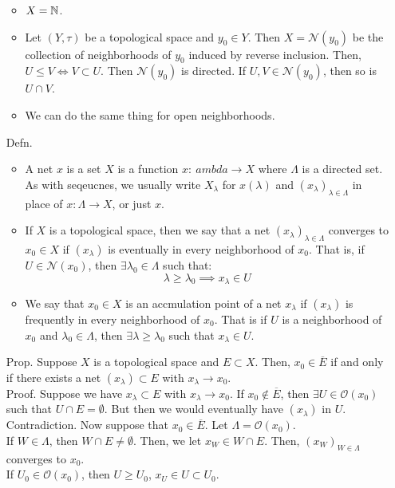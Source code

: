 \documentclass[12pt]{article}
\begin{document}
\begin{itemize}
\begin{itemize}
        \item $X = \N$. 
        \item Let $(Y, \tau)$ be a topological space and $y_0 \in Y$. Then $X = \mathcal{N}(y_0)$ be the collection of neighborhoods of $y_0$ induced by reverse inclusion. Then, $U \leq V \iff V \subset U$. Then $\mathcal{N}(y_0)$ is directed. If $U, V \in \mathcal{N}(y_0)$, then so is $U \cap V$. 
        \item We can do the same thing for open neighborhoods. 
    \end{itemize} 
    \item[Defn.] \begin{itemize}
        \item A net $x$ is a set $X$ is a function $x: \:ambda \to X$ where $\Lambda$ is a directed set. As with seqeucnes, we usually write $X_\lambda$ for $x(\lambda)$ and $(x_\lambda)_{\lambda \in \Lambda}$ in place of $x: \Lambda \to X$, or just $x$. 
        \item If $X$ is a topological space, then we say that a net $(x_\lambda)_{\lambda \in \Lambda}$ converges to $x_0 \in X$ if $(x_\lambda)$ is eventually in every neighborhood of $x_0$. That is, if $U \in \mathcal{N}(x_0)$, then $\exists \lambda_0 \in \Lambda$ such that: 
        \[ \lambda \geq \lambda_0  \implies x_\lambda \in U \]
        \item We say that $x_0 \in X$ is an accmulation point of a net $x_\lambda$ if $(x_\lambda)$ is frequently in every neighborhood of $x_0$. That is if $U$ is a neighborhood of $x_0$ and $\lambda_0 \in \Lambda$, then $\exists \lambda \geq \lambda_0$ such that $x_\lambda \in U$.
    \end{itemize}
    \item[Prop.] Suppose $X$ is a topological space and $E \subset X$. Then, $x_0 \in \overline{E}$ if and only if there exists a net $(x_\lambda) \subset E$ with $x_\lambda \to x_0$. \\
    Proof. Suppose we have $x_\lambda \subset E$ with $x_\lambda \to x_0$. If $x_0 \not \in \overline{E}$, then $\exists U \in \mathcal{O}(x_0)$ such that $U \cap E = \emptyset$. But then we would eventually have $(x_\lambda)$ in $U$. Contradiction. \bbni
    Now suppose that $x_0 \in \overline{E}$. Let $\Lambda = \mathcal{O}(x_0)$.  \\
    If $W \in \Lambda$, then $W \cap E \neq \emptyset$. Then, we let $x_W \in W \cap E$. Then, $(x_W)_{W \in \Lambda}$ converges to $x_0$. \\
    If $U_0 \in \mathcal{O}(x_0)$, then $U \geq U_0$, $x_U \in U \subset U_0$. 

\end{itemize}
\end{document}
